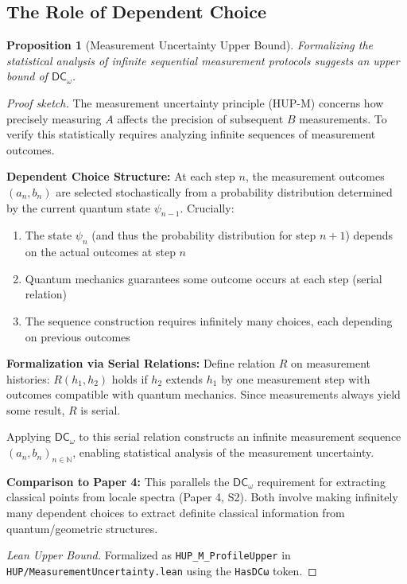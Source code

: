 \documentclass[11pt]{article}
\newcommand{\DCw}{\mathsf{DC}_{\omega}}
\newcommand{\lean}[1]{\texttt{#1}}
\newcommand{\leanok}{\text{\tiny [✓ Lean]}}
\theoremstyle{plain}
\newtheorem{proposition}[theorem]{Proposition}
\theoremstyle{definition}
\theoremstyle{remark}
\newenvironment{prfsketch}{\noindent\textit{Proof sketch.} }{}
\begin{document}
\subsection{The Role of Dependent Choice}

\begin{proposition}[Measurement Uncertainty Upper Bound] \leanok
Formalizing the statistical analysis of infinite sequential measurement protocols suggests an upper bound of $\DCw$.
\end{proposition}

\begin{prfsketch}
The measurement uncertainty principle (HUP-M) concerns how precisely measuring $A$ affects the precision of subsequent $B$ measurements. To verify this statistically requires analyzing infinite sequences of measurement outcomes.

\textbf{Dependent Choice Structure:}
At each step $n$, the measurement outcomes $(a_n, b_n)$ are selected stochastically from a probability distribution determined by the current quantum state $\psi_{n-1}$. Crucially:
\begin{enumerate}
\item The state $\psi_n$ (and thus the probability distribution for step $n+1$) depends on the actual outcomes at step $n$
\item Quantum mechanics guarantees some outcome occurs at each step (serial relation)
\item The sequence construction requires infinitely many choices, each depending on previous outcomes
\end{enumerate}

\textbf{Formalization via Serial Relations:}
Define relation $R$ on measurement histories: $R(h_1, h_2)$ holds if $h_2$ extends $h_1$ by one measurement step with outcomes compatible with quantum mechanics. Since measurements always yield some result, $R$ is serial.

Applying $\DCw$ to this serial relation constructs an infinite measurement sequence $(a_n, b_n)_{n \in \mathbb{N}}$, enabling statistical analysis of the measurement uncertainty.

\textbf{Comparison to Paper 4:} This parallels the $\DCw$ requirement for extracting classical points from locale spectra (Paper 4, S2). Both involve making infinitely many dependent choices to extract definite classical information from quantum/geometric structures.
\end{prfsketch}

\begin{proof}[Lean Upper Bound]
Formalized as \lean{HUP\_M\_ProfileUpper} in \texttt{HUP/MeasurementUncertainty.lean} using the \lean{HasDCω} token.
\end{proof}
\end{document}
